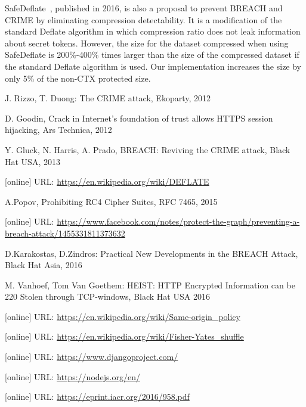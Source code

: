 \documentclass[a4paper, 11 pt, conference]{article}  %
\begin{document}
SafeDeflate~\cite{c16}, published in 2016, is also a proposal to prevent BREACH
and CRIME by eliminating compression detectability. It is a modification of the
standard Deflate algorithm in which compression ratio does not leak information
about secret tokens. However, the size for the dataset compressed when using
SafeDeflate is 200\%-400\% times larger than the size of the compressed dataset if the
standard Deflate algorithm is used. Our implementation increases the size by only 5\% of the non-CTX protected size.

\begin{thebibliography}{13}

 J. Rizzo, T. Duong: The CRIME attack, Ekoparty, 2012

 D. Goodin, Crack in Internet’s foundation of trust allows HTTPS session hijacking, Ars Technica, 2012

 Y. Gluck, N. Harris, A. Prado, BREACH: Reviving the CRIME attack, Black Hat USA, 2013

 [online] URL: \url{https://en.wikipedia.org/wiki/DEFLATE} 

 A.Popov, Prohibiting RC4 Cipher Suites, RFC 7465, 2015

 [online] URL: \url{https://www.facebook.com/notes/protect-the-graph/preventing-a-breach-attack/1455331811373632}

  D.Karakostas, D.Zindros: Practical New Developments in the BREACH Attack, Black Hat Asia, 2016

 M. Vanhoef, Tom Van Goethem: HEIST: HTTP Encrypted Information can be 220 Stolen through TCP-windows, Black Hat USA 2016

[online] URL: \url{https://en.wikipedia.org/wiki/Same-origin_policy} 

 [online] URL: \url{https://en.wikipedia.org/wiki/Fisher-Yates_shuffle}

 [online] URL: \url{https://www.djangoproject.com/} 

 [online] URL: \url{https://nodejs.org/en/} 

 [online] URL: \url{https://eprint.iacr.org/2016/958.pdf}

\end{thebibliography}
\end{document}
